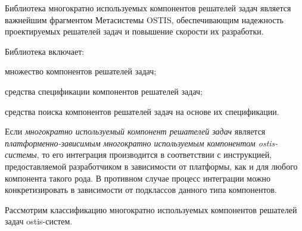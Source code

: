 
Библиотека многократно используемых компонентов решателей задач является важнейшим фрагментом Метасистемы OSTIS, обеспечивающим надежность проектируемых решателей задач и повышение скорости их разработки.

Библиотека включает:
\begin{textitemize}
\item множество компонентов решателей задач;
\item средства спецификации компонентов решателей задач;
\item средства поиска компонентов решателей задач на основе их спецификации.
\end{textitemize}

Если \textit{многократно используемый компонент решателей задач} является \textit{платформенно-зависимым многократно используемым компонентом ostis-системы}, то его интеграция производится в соответствии с инструкцией, предоставляемой разработчиком в зависимости от платформы, как и для любого компонента такого рода. В противном случае процесс интеграции можно конкретизировать в зависимости от подклассов данного типа компонентов. 

Рассмотрим классификацию многократно используемых компонентов решателей задач ostis-систем.

